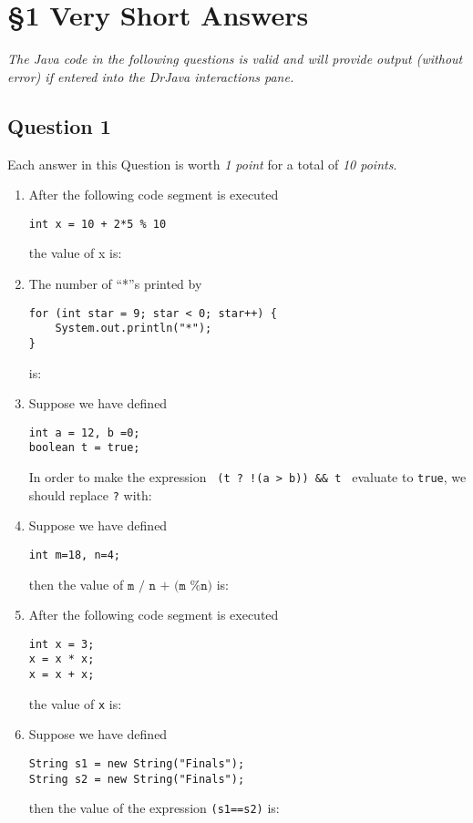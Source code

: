 \section*{\S 1 Very Short Answers}

\emph{The Java code in the following questions is valid and will provide output (without error) if entered into 
the DrJava interactions pane.} 

\subsection*{Question 1}
Each answer in this Question is worth \emph{1 point} for a total of \emph{10 points}.

\renewcommand{\labelenumi}{\alph{enumi}.}
\begin{enumerate}
\item After the following code segment is executed
\begin{verbatim}
int x = 10 + 2*5 % 10 
\end{verbatim}
the value of x is: \Ans

\item The number of ``*''s printed by
\begin{verbatim}
for (int star = 9; star < 0; star++) {
    System.out.println("*");
}
\end{verbatim}
is: \Ans

\item Suppose we have defined
\begin{verbatim}
int a = 12, b =0;
boolean t = true;
\end{verbatim}
In order to make the expression \texttt{ (t ? !(a > b)) \&\& t } evaluate to \texttt{true}, we should replace \texttt{?} with:

\Ans

\item Suppose we have defined
\begin{verbatim}
int m=18, n=4;
\end{verbatim}
then the value of $\texttt{m / n + (m \% n)}$ is:\Ans

\clearpage
\item After the following code segment is executed
\begin{verbatim}
int x = 3;
x = x * x;
x = x + x;
\end{verbatim}
the value of \texttt{x} is: \Ans

\item Suppose we have defined
\begin{verbatim}
String s1 = new String("Finals");
String s2 = new String("Finals");
\end{verbatim}
then the value of the expression \texttt{(s1==s2)} is: \Ans


\end{enumerate}
